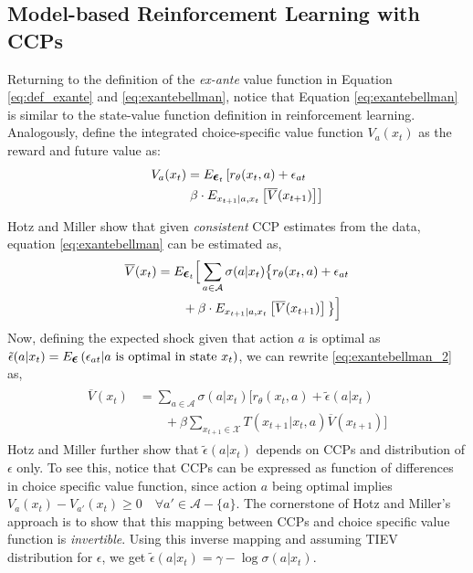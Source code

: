 \documentclass{article}
\renewcommand{\vec}[1]{\mbox{\bm{$#1$}}}
\begin{document}
\subsection{Model-based Reinforcement Learning with CCPs}

Returning to the definition of the \emph{ex-ante} value function in Equation \eqref{eq:def_exante} and \eqref{eq:exantebellman}, notice that Equation \eqref{eq:exantebellman} is similar to the state-value function definition in reinforcement learning. 
Analogously, define the integrated choice-specific value function $V_a(x_t)$ as the reward and future value as:
\begin{align}
\begin{split}
V_a(x_t) &= E_{\vec{\epsilon}_t}\left[r_{\theta}(x_t,a)+\epsilon_{at}\right.\\
&
\left.\beta\cdot E_{x_{t+1}|a,x_t} \left[ \overline{V}(x_{t+1}) \right] \right]
\end{split}
\end{align}

Hotz and Miller  show that given \textit{consistent} CCP estimates from the data, equation \eqref{eq:exantebellman} can be estimated as,
\begin{align} \label{eq:exantebellman_2}
\begin{split}
\overline{V}(x_t) & = E_{\vec{\epsilon}_t}\Big[\sum_{a\in\mathcal{A}} \sigma(a|x_t) \big\{r_{\theta}(x_t,a)+\epsilon_{at} \\
& \qquad +\beta  \cdot E_{x_{t+1}|a,x_t} \left[ \overline{V}(x_{t+1}) \right] \big\}\Big]\\
\end{split}
\end{align}
Now, defining the expected shock given that action $a$ is optimal as $\tilde{\epsilon}(a|x_t) = E_{\vec{\epsilon}}\left( \epsilon_{at} |a\ \textrm{is optimal in state } x_t\right)$, we can rewrite \eqref{eq:exantebellman_2} as,
\begin{align} \label{eq:exantebellman_3}
\begin{split}
\overline{V}(x_t) & = \sum_{a\in\mathcal{A}} \sigma(a|x_t) \Big[r_{\theta}(x_t,a)+\tilde{\epsilon}(a|x_t) \\
& \qquad +\beta \sum_{x_{t+1}\in\mathcal{X}} T(x_{t+1}|x_t,a) \overline{V}(x_{t+1})\Big]
\end{split}
\end{align}
Hotz and Miller  further show that $\tilde{\epsilon}(a|x_t)$ depends on CCPs and distribution of $\epsilon$ only.
To see this, notice that CCPs can be expressed as function of differences in choice specific value function, since action $a$ being optimal implies $V_a(x_t)- V_{a'}(x_t)\geq 0 \quad\forall a'\in\mathcal{A} - \{a\}$. The cornerstone of Hotz and Miller's approach is to show that this mapping between CCPs and choice specific value function is \emph{invertible}. Using this inverse mapping and assuming TIEV distribution for $\epsilon$, we get $\tilde{\epsilon}(a|x_t) = \gamma - \log \sigma(a|x_t)$.
\end{document}
